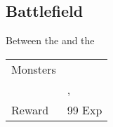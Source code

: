 \subsection{Battlefield}
\label{map:battlefield_04}

Between the  and the 

\noindent\begin{tabularx}{\textwidth}[l]{lX}
	Monsters
	& \nameref{monster:mint_mint} \\
	& \nameref{monster:mint_mint}, \nameref{monster:mint_mint}
\\ \hline
	Reward & 99 Exp
\end{tabularx}
